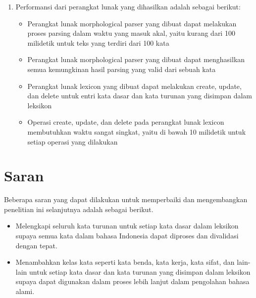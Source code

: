 \begin{enumerate}
	\item Performansi dari perangkat lunak yang dihasilkan adalah sebagai berikut:
	\begin{itemize}
		\item Perangkat lunak morphological parser yang dibuat dapat melakukan proses parsing dalam waktu yang masuk akal, yaitu kurang dari 100 milidetik untuk teks yang terdiri dari 100 kata
		\item Perangkat lunak morphological parser yang dibuat dapat menghasilkan semua kemungkinan hasil parsing yang valid dari sebuah kata
		\item Perangkat lunak lexicon yang dibuat dapat melakukan create, update, dan delete untuk entri kata dasar dan kata turunan yang disimpan dalam leksikon
		\item Operasi create, update, dan delete pada perangkat lunak lexicon membutuhkan waktu sangat singkat, yaitu di bawah 10 milidetik untuk setiap operasi yang dilakukan
	\end{itemize}
	
\end{enumerate}


\section{Saran}
\label{sec:saran}

Beberapa saran yang dapat dilakukan untuk memperbaiki dan mengembangkan penelitian ini selanjutnya adalah sebagai berikut.

\begin{itemize}
	\item Melengkapi seluruh kata turunan untuk setiap kata dasar dalam leksikon supaya semua kata dalam bahasa Indonesia dapat diproses dan divalidasi dengan tepat.
	\item Menambahkan kelas kata seperti kata benda, kata kerja, kata sifat, dan lain-lain untuk setiap kata dasar dan kata turunan yang disimpan dalam leksikon supaya dapat digunakan dalam proses lebih lanjut dalam pengolahan bahasa alami.
\end{itemize}